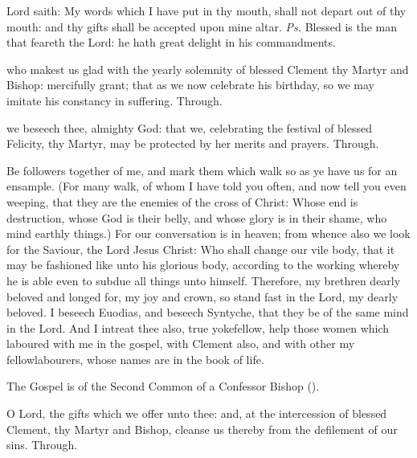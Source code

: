 \introit
{} Lord saith: My words which I have put in thy mouth, shall not depart out of thy mouth: and thy gifts shall be accepted upon mine altar. \textit{Ps.} Blessed is the man that feareth the Lord: he hath great delight in his commandments.

\collect
{} who makest us glad with the yearly solemnity of blessed Clement thy Martyr and Bishop: mercifully grant; that as we now celebrate his birthday, so we may imitate his constancy in suffering. Through.

 we beseech thee, almighty God: that we, celebrating the festival of blessed Felicity, thy Martyr, may be protected by her merits and prayers. Through.

 Be followers together of me, and mark them which walk so as ye have us for an ensample. (For many walk, of whom I have told you often, and now tell you even weeping, that they are the enemies of the cross of Christ: Whose end is destruction, whose God is their belly, and whose glory is in their shame, who mind earthly things.) For our conversation is in heaven; from whence also we look for the Saviour, the Lord Jesus Christ: Who shall change our vile body, that it may be fashioned like unto his glorious body, according to the working whereby he is able even to subdue all things unto himself. Therefore, my brethren dearly beloved and longed for, my joy and crown, so stand fast in the Lord, my dearly beloved. I beseech Euodias, and beseech Syntyche, that they be of the same mind in the Lord. And I intreat thee also, true yokefellow, help those women which laboured with me in the gospel, with Clement also, and with other my fellowlabourers, whose names are in the book of life.


\begin{rubric}
	The Gospel is of the Second Common of a Confessor Bishop (\pageref{CommonConfessorBishopII}).
\end{rubric}


\secret
{} O Lord, the gifts which we offer unto thee: and, at the intercession of blessed Clement, thy Martyr and Bishop, cleanse us thereby from the defilement of our sins. Through.

